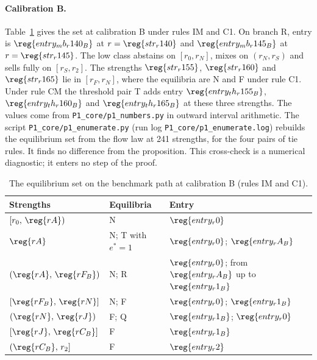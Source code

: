 \paragraph{Calibration B.}
Table~\ref{tab:a4-set} gives the set at calibration B under rules IM and C1. On branch R, entry is
\(\reg{entry_mb_r140_B}\) at \(r=\reg{str_r140}\) and \(\reg{entry_mb_r145_B}\) at \(r=\reg{str_r145}\). The low class abstains on
\([r_0,r_N]\), mixes on \((r_N,r_S)\) and sells fully on \([r_S,r_2]\). The strengths \(\reg{str_r155}\), \(\reg{str_r160}\) and
\(\reg{str_r165}\) lie in \([r_F,r_N]\), where the equilibria are N and F under rule C1. Under rule CM the threshold pair T
adds entry \(\reg{entry_th_r155_B}\), \(\reg{entry_th_r160_B}\) and \(\reg{entry_th_r165_B}\) at these three
strengths. The values come from \nolinkurl{P1_core/p1_numbers.py} in
outward interval arithmetic. The script
\nolinkurl{P1_core/p1_enumerate.py} (run log
\nolinkurl{P1_core/p1_enumerate.log}) rebuilds the equilibrium set from
the flow law at 241 strengths, for the four pairs of tie rules. It finds no difference from the proposition. This
cross-check is a numerical diagnostic; it enters no step of the proof.

\begin{table}[ht]
\centering
\caption{The equilibrium set on the benchmark path at calibration B (rules IM and C1).}\label{tab:a4-set}
\small
\begin{tabular}{@{}lll@{}}
\toprule
Strengths & Equilibria & Entry\\
\midrule
\([r_0,\,\reg{rA})\) & N & \(\reg{entry_r0}\)\\
\(\reg{rA}\) & N; T with \(e^*=1\) & \(\reg{entry_r0}\); \(\reg{entry_rA_B}\)\\
\((\reg{rA},\,\reg{rF_B})\) & N; R & \(\reg{entry_r0}\); from \(\reg{entry_rA_B}\) up to \(\reg{entry_r1_B}\)\\
\([\reg{rF_B},\,\reg{rN}]\) & N; F & \(\reg{entry_r0}\); \(\reg{entry_r1_B}\)\\
\((\reg{rN},\,\reg{rJ})\) & F; Q & \(\reg{entry_r1_B}\); \(\reg{entry_r0}\)\\
\([\reg{rJ},\,\reg{rC_B}]\) & F & \(\reg{entry_r1_B}\)\\
\((\reg{rC_B},\,r_2]\) & F & \(\reg{entry_r2}\)\\
\bottomrule
\end{tabular}
\end{table}

